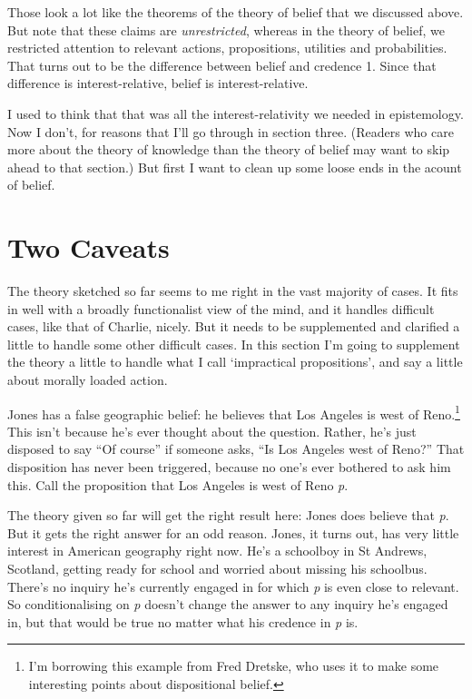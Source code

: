\documentclass[
  10pt,
  letterpaper,
  DIV=11,
  numbers=noendperiod,
  twoside]{scrartcl}
\begin{document}
Those look a lot like the theorems of the theory of belief that we
discussed above. But note that these claims are \emph{unrestricted},
whereas in the theory of belief, we restricted attention to relevant
actions, propositions, utilities and probabilities. That turns out to be
the difference between belief and credence 1. Since that difference is
interest-relative, belief is interest-relative.

I used to think that that was all the interest-relativity we needed in
epistemology. Now I don't, for reasons that I'll go through in section
three. (Readers who care more about the theory of knowledge than the
theory of belief may want to skip ahead to that section.) But first I
want to clean up some loose ends in the acount of belief.

\section{Two Caveats}\label{two-caveats}

The theory sketched so far seems to me right in the vast majority of
cases. It fits in well with a broadly functionalist view of the mind,
and it handles difficult cases, like that of Charlie, nicely. But it
needs to be supplemented and clarified a little to handle some other
difficult cases. In this section I'm going to supplement the theory a
little to handle what I call `impractical propositions', and say a
little about morally loaded action.

Jones has a false geographic belief: he believes that Los Angeles is
west of Reno.\footnote{I'm borrowing this example from Fred Dretske, who
  uses it to make some interesting points about dispositional belief.}
This isn't because he's ever thought about the question. Rather, he's
just disposed to say ``Of course'' if someone asks, ``Is Los Angeles
west of Reno?'' That disposition has never been triggered, because no
one's ever bothered to ask him this. Call the proposition that Los
Angeles is west of Reno \emph{p}.

The theory given so far will get the right result here: Jones does
believe that \emph{p}. But it gets the right answer for an odd reason.
Jones, it turns out, has very little interest in American geography
right now. He's a schoolboy in St Andrews, Scotland, getting ready for
school and worried about missing his schoolbus. There's no inquiry he's
currently engaged in for which \emph{p} is even close to relevant. So
conditionalising on \emph{p} doesn't change the answer to any inquiry
he's engaged in, but that would be true no matter what his credence in
\emph{p} is.
\end{document}
